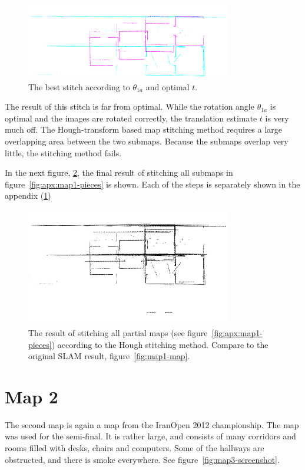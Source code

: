\begin{figure}[ht]
  \centering
  \includegraphics[width=0.8\textwidth]{images/experiment/map1/stitch1-1a-result.png}
  \caption{The best stitch according to $\theta_{1a}$ and optimal $t$.}
  \label{fig:exp:1:result1}
\end{figure}

The result of this stitch is far from optimal. While the rotation angle $\theta_{1a}$ is optimal and the images are rotated correctly, the translation estimate $t$ is very much off. The Hough-transform based map stitching method requires a large overlapping area between the two submaps. Because the submaps overlap very little, the stitching method fails.

In the next figure, \ref{fig:exp:1:result8}, the final result of stitching all submaps in figure~\ref{fig:apx:map1-pieces} is shown. Each of the steps is separately shown in the appendix (\ref{})

\begin{figure}[ht]
  \centering
  \includegraphics[width=0.8\textwidth]{images/experiment/map1/result/step8.png}
  \caption{The result of stitching all partial maps (see figure~\ref{fig:apx:map1-pieces}) according to the Hough stitching method. Compare to the original SLAM result, figure~\ref{fig:map1-map}.}
  \label{fig:exp:1:result8}
\end{figure}

\section{Map 2}
The second map is again a map from the IranOpen 2012 championship. The map was used for the semi-final. It is rather large, and consists of many corridors and rooms filled with desks, chairs and computers. Some of the hallways are obstructed, and there is smoke everywhere. See figure~\ref{fig:map3-screenshot}.


